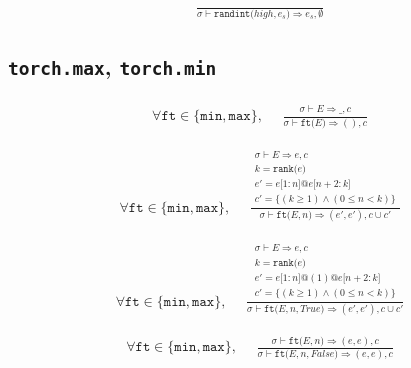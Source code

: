 \documentclass{article}
\makeatletter
\newcommand{\Rar}{\Rightarrow}
\newcommand{\mtt}[1]{\mathtt{#1}}
\newcommand{\bigspace}{\,\,\,\,\,\,\,\,}
\newcommand{\op}[2]{\mtt{#1(}#2\mtt{)}}
\newcommand{\conc}{\mtt{@}}
\newcommand{\indr}[2]{\mtt{[}#1\mtt{:}#2\mtt{]}}
\makeatother
\begin{document}
\begin{align*}
  \frac
  {
  }
  {
    \sigma \vdash \op{randint}{high, e_s} \Rar e_s, \emptyset
  }
\end{align*}%

\subsection*{\texttt{torch.max}, \texttt{torch.min}}%
\begin{align*}
  \forall \mtt{ft} \in \{\mtt{min}, \mtt{max}\},
  \bigspace
  \frac
  {
    \begin{array}{l}
      \sigma \vdash E \Rar \_, c
    \end{array}
  }
  {
    \sigma \vdash \op{ft}{E} \Rar (), c
  }
\end{align*}

\begin{align*}
  \forall \mtt{ft} \in \{\mtt{min}, \mtt{max}\},
  \bigspace
  \frac
  {
    \begin{array}{l}
      \sigma \vdash E \Rar e, c \\
      k = \op{rank}{e} \\
      e' = e \indr{1}{n} \conc e \indr{n+2}{k} \\
      c' = \{ (k \geq 1) \land (0 \leq n < k) \}
    \end{array}
  }
  {
    \sigma \vdash \op{ft}{E, n} \Rar (e', e'), c \cup c'
  }
  \tag*{tuple 형태로 반환}
\end{align*}

\begin{align*}
  \forall \mtt{ft} \in \{\mtt{min}, \mtt{max}\},
  \bigspace
  \frac
  {
    \begin{array}{l}
      \sigma \vdash E \Rar e, c \\
      k = \op{rank}{e} \\
      e' = e \indr{1}{n} \conc (1) \conc e \indr{n+2}{k} \\
      c' = \{ (k \geq 1) \land (0 \leq n < k) \}
    \end{array}
  }
  {
    \sigma \vdash \op{ft}{E, n, True} \Rar (e', e'), c \cup c'
  }
  \tag*{tuple 형태로 반환}
\end{align*}

\begin{align*}
  \forall \mtt{ft} \in \{\mtt{min}, \mtt{max}\},
  \bigspace
  \frac
  {
    \sigma \vdash \op{ft}{E, n} \Rar (e, e), c
  }
  {
    \sigma \vdash \op{ft}{E, n, False} \Rar (e, e), c
  }
  \tag*{tuple 형태로 반환}
\end{align*}
\end{document}
